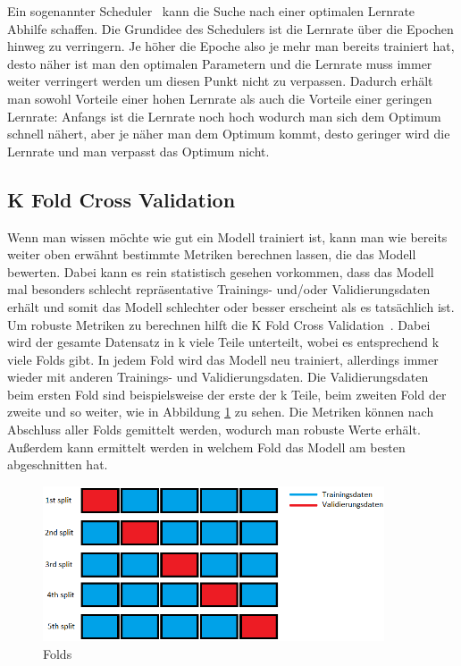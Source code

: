\documentclass[12pt, a4paper]{article}
\begin{document}
Ein sogenannter Scheduler~\cite{o2} kann die Suche nach einer optimalen Lernrate Abhilfe schaffen. Die Grundidee des Schedulers ist die Lernrate über die Epochen hinweg zu verringern. Je höher die Epoche also je mehr man bereits trainiert hat, desto näher ist man den optimalen Parametern und die Lernrate muss immer weiter verringert werden um diesen Punkt nicht zu verpassen. Dadurch erhält man sowohl Vorteile einer hohen Lernrate als auch die Vorteile einer geringen Lernrate: Anfangs ist die Lernrate noch hoch wodurch man sich dem Optimum schnell nähert, aber je näher man dem Optimum kommt, desto geringer wird die Lernrate und man verpasst das Optimum nicht.

\subsection{K Fold Cross Validation}
Wenn man wissen möchte wie gut ein Modell trainiert ist, kann man wie bereits weiter oben erwähnt bestimmte Metriken berechnen lassen, die das Modell bewerten. Dabei kann es rein statistisch gesehen vorkommen, dass das Modell mal besonders schlecht repräsentative Trainings- und/oder Validierungsdaten erhält und somit das Modell schlechter oder besser erscheint als es tatsächlich ist. Um robuste Metriken zu berechnen hilft die K Fold Cross Validation~\cite{o3}. Dabei wird der gesamte Datensatz in k viele Teile unterteilt, wobei es entsprechend k viele Folds gibt. In jedem Fold wird das Modell neu trainiert, allerdings immer wieder mit anderen Trainings- und Validierungsdaten. Die Validierungsdaten beim ersten Fold sind beispielsweise der erste der k Teile, beim zweiten Fold der zweite und so weiter, wie in Abbildung \ref{fig:folds} zu sehen. Die Metriken können nach Abschluss aller Folds gemittelt werden, wodurch man robuste Werte erhält. Außerdem kann ermittelt werden in welchem Fold das Modell am besten abgeschnitten hat.

\begin{figure}[t]
\centering
\includegraphics[width=0.9\textwidth]{folds.png}
\caption{Folds}
\label{fig:folds}
\end{figure}
\end{document}

